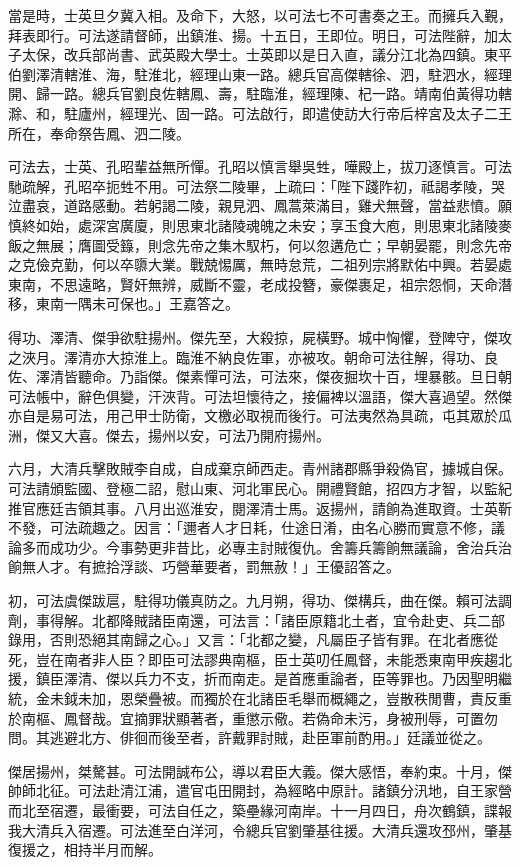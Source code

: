 \begin{pinyinscope}
當是時，士英旦夕冀入相。及命下，大怒，以可法七不可書奏之王。而擁兵入覲，拜表即行。可法遂請督師，出鎮淮、揚。十五日，王即位。明日，可法陛辭，加太子太保，改兵部尚書、武英殿大學士。士英即以是日入直，議分江北為四鎮。東平伯劉澤清轄淮、海，駐淮北，經理山東一路。總兵官高傑轄徐、泗，駐泗水，經理開、歸一路。總兵官劉良佐轄鳳、壽，駐臨淮，經理陳、杞一路。靖南伯黃得功轄滁、和，駐廬州，經理光、固一路。可法啟行，即遣使訪大行帝后梓宮及太子二王所在，奉命祭告鳳、泗二陵。

可法去，士英、孔昭輩益無所憚。孔昭以慎言舉吳甡，嘩殿上，拔刀逐慎言。可法馳疏解，孔昭卒扼甡不用。可法祭二陵畢，上疏曰：「陛下踐阼初，祗謁孝陵，哭泣盡哀，道路感動。若躬謁二陵，親見泗、鳳蒿萊滿目，雞犬無聲，當益悲憤。願慎終如始，處深宮廣廈，則思東北諸陵魂魄之未安；享玉食大庖，則思東北諸陵麥飯之無展；膺圖受籙，則念先帝之集木馭朽，何以忽遘危亡；早朝晏罷，則念先帝之克儉克勤，何以卒隳大業。戰兢惕厲，無時怠荒，二祖列宗將默佑中興。若晏處東南，不思遠略，賢奸無辨，威斷不靈，老成投簪，豪傑裹足，祖宗怨恫，天命潛移，東南一隅未可保也。」王嘉答之。

得功、澤清、傑爭欲駐揚州。傑先至，大殺掠，屍橫野。城中恟懼，登陴守，傑攻之浹月。澤清亦大掠淮上。臨淮不納良佐軍，亦被攻。朝命可法往解，得功、良佐、澤清皆聽命。乃詣傑。傑素憚可法，可法來，傑夜掘坎十百，埋暴骸。旦日朝可法帳中，辭色俱變，汗浹背。可法坦懷待之，接偏裨以溫語，傑大喜過望。然傑亦自是易可法，用己甲士防衛，文檄必取視而後行。可法夷然為具疏，屯其眾於瓜洲，傑又大喜。傑去，揚州以安，可法乃開府揚州。

六月，大清兵擊敗賊李自成，自成棄京師西走。青州諸郡縣爭殺偽官，據城自保。可法請頒監國、登極二詔，慰山東、河北軍民心。開禮賢館，招四方才智，以監紀推官應廷吉領其事。八月出巡淮安，閱澤清士馬。返揚州，請餉為進取資。士英靳不發，可法疏趣之。因言：「邇者人才日耗，仕途日淆，由名心勝而實意不修，議論多而成功少。今事勢更非昔比，必專主討賊復仇。舍籌兵籌餉無議論，舍治兵治餉無人才。有摭拾浮談、巧營華要者，罰無赦！」王優詔答之。

初，可法虞傑跋扈，駐得功儀真防之。九月朔，得功、傑構兵，曲在傑。賴可法調劑，事得解。北都降賊諸臣南還，可法言：「諸臣原籍北土者，宜令赴吏、兵二部錄用，否則恐絕其南歸之心。」又言：「北都之變，凡屬臣子皆有罪。在北者應從死，豈在南者非人臣？即臣可法謬典南樞，臣士英叨任鳳督，未能悉東南甲疾趨北援，鎮臣澤清、傑以兵力不支，折而南走。是首應重論者，臣等罪也。乃因聖明繼統，金未鉞未加，恩榮疊被。而獨於在北諸臣毛舉而概繩之，豈散秩閒曹，責反重於南樞、鳳督哉。宜摘罪狀顯著者，重懲示儆。若偽命未污，身被刑辱，可置勿問。其逃避北方、俳徊而後至者，許戴罪討賊，赴臣軍前酌用。」廷議並從之。

傑居揚州，桀驁甚。可法開誠布公，導以君臣大義。傑大感悟，奉約束。十月，傑帥師北征。可法赴清江浦，遣官屯田開封，為經略中原計。諸鎮分汛地，自王家營而北至宿遷，最衝要，可法自任之，築壘緣河南岸。十一月四日，舟次鶴鎮，諜報我大清兵入宿遷。可法進至白洋河，令總兵官劉肇基往援。大清兵還攻邳州，肇基復援之，相持半月而解。


\end{pinyinscope}
